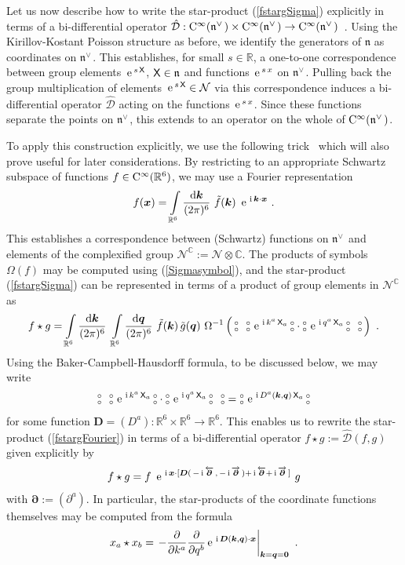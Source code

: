 \documentclass[11pt,a4paper]{article}
\newcommand{\NO}{\mbox{$\substack{\circ\\\circ}$}}      %
\newcommand{\1}{\mathbb{1}}
\newcommand{\mbf}[1]{{\boldsymbol {#1} }}
\def\ii{{\,{\rm i}\,}}
\def\dd{{\rm d}}
\def\CC{{\rm C}}
\def\X{{\sf X}}
\def\mx{{\mbf x}}
\def\mk{{\mbf k}}
\def\mq{{\mbf q}}
\def\mD{{\mbf D}}
\def\mdell{{\mbf\partial}}
\def\mfn{{\mathfrak n}}
\newcommand{\complex}{{\mathbb C}} %
\newcommand{\real}{{\mathbb R}} %
\def\e{{\,\rm e}\,}
\newcommand{\beq}{\begin{eqnarray}}
\newcommand{\eeq}{\end{eqnarray}}
\begin{document}
Let us now describe how to write the star-product (\ref{fstargSigma})
explicitly in terms of a bi-differential operator
$\hat{\mathcal{D}}:\CC^\infty(\mfn^{\vee\,})\times\CC^\infty(\mfn^{\vee\,})\to
\CC^\infty(\mfn^{\vee\,})$~\cite{Kathotia1}. Using the
Kirillov-Kostant Poisson structure as
before, we identify the generators of $\mfn$ as coordinates on
$\mfn^{\vee\,}$. This establishes, for small $s\in\real$, a one-to-one
correspondence between group elements $\e^{s\,\X}$, $\X\in\mfn$ and
functions $\e^{s\,x}$ on $\mfn^{\vee\,}$. Pulling back the group
multiplication of elements $\e^{s\,\X}\in\mathcal{N}$ via this
correspondence induces a bi-differential operator $\hat{\mathcal{D}}$
acting on the functions $\e^{s\,x}$. Since these functions separate
the points on $\mfn^{\vee\,}$, this extends to an operator on the whole
of $\CC^\infty(\mfn^{\vee\,})$.

To apply this construction explicitly, we use the following
trick~\cite{MSSW1,BehrSyk1} which will also prove useful for later
considerations. By restricting to an appropriate Schwartz subspace of
functions $f\in\CC^\infty(\real^6)$, we may use a Fourier
representation
\beq
f(\mx)=\int\limits_{\real^6}\frac{\dd\mk}{(2\pi)^6}~\tilde f(\mk)~
\e^{\ii\mk\cdot\mx} \ .
\label{Fouriertransfdef}\eeq
This establishes a correspondence between (Schwartz) functions on
$\mfn^{\vee\,}$ and elements of the complexified group
$\mathcal{N}^\complex:=\mathcal{N}\otimes\complex$. The products
of symbols $\Omega(f)$ may be computed using (\ref{Sigmasymbol}), and
the star-product (\ref{fstargSigma}) can be represented in terms of a
product of group elements in $\mathcal{N}^\complex$ as
\beq
f\star g=\int\limits_{\real^6}\frac{\dd\mk}{(2\pi)^6}~
\int\limits_{\real^6}\frac{\dd\mq}{(2\pi)^6}~\tilde f(\mk)\,
\tilde g(\mq)~\Omega^{-1}\left(\,\NO~~\NO\,\e^{\ii k^a\,\X_a}\,\NO\cdot
\NO\,\e^{\ii q^a\,\X_a}\,\NO~~\NO\,\right) \ .
\label{fstargFourier}\eeq
Using the Baker-Campbell-Hausdorff formula, to be discussed below, we
may write
\beq
\NO~~\NO\,\e^{\ii k^a\,\X_a}\,\NO\cdot\NO\,\e^{\ii q^a\,\X_a}\,\NO~~\NO=
\NO\,\e^{\ii D^a(\mk,\mq)\,\X_a}\,\NO
\label{NOproductsBCH}\eeq
for some function $\mD=(D^a):\real^6\times\real^6\to\real^6$. This
enables us to rewrite the star-product (\ref{fstargFourier}) in terms
of a bi-differential operator $f\star g:=\hat{\mathcal{D}}(f,g)$ given
explicitly by
\beq
f\star
g=f~\e^{\ii\mx\cdot[\mD(\,-\ii\overleftarrow{\mdell}
\,,\,-\ii\overrightarrow{\mdell}\,)+\ii\overleftarrow{\mdell}+\ii
\overrightarrow{\mdell}\,]}~g
\label{fstargbidiff}\eeq
with $\mdell:=(\partial^a)$. In particular, the star-products of
the coordinate functions themselves may be computed from the formula
\beq
x_a\star x_b=\left.-\frac{\partial}{\partial k^a}\frac\partial
{\partial q^b}\e^{\ii\mD(\mk,\mq)\cdot\mx}\right|_{\mk=\mq=\mbf0} \ .
\label{xastarxb}\eeq
\end{document}
